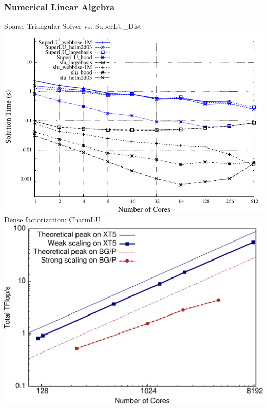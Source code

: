 \begin{frame}
\frametitle{Numerical Linear Algebra}
%
Sparse Triangular Solver vs. SuperLU\_Dist
\includegraphics[scale=0.45]{../figures/sparselu_superlu_comparison.pdf}\\
Dense factorization: CharmLU
\includegraphics[scale=0.2]{../figures/charmlu_scaling.pdf}
\end{frame}

